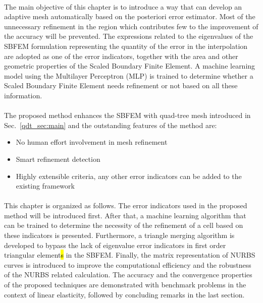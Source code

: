 \paragraph{}
The main objective of this chapter is to introduce a way that can develop an adaptive mesh automatically based on the posteriori error estimator.
Most of the unnecessary refinement in the region which contributes few to the improvement of the accuracy will be prevented.
The expressions related to the eigenvalues of the SBFEM formulation representing the quantity of the error in the interpolation are adopted as one of the error indicators, together with the area and other geometric properties of the Scaled Boundary Finite Element.
A machine learning model using the Multilayer Perceptron (MLP) is trained to determine whether a Scaled Boundary Finite Element needs refinement or not based on all these information.

\paragraph{}
The proposed method enhances the SBFEM with quad-tree mesh introduced in Sec.~\ref{qdt_sec:main} and the outstanding features of the method are:
\begin{itemize}
    \item No human effort involvement in mesh refinement
    \item Smart refinement detection
    \item Highly extensible criteria, any other error indicators can be added to the existing framework
\end{itemize}

\paragraph{}
This chapter is organized as follows.
The error indicators used in the proposed method will be introduced first.
After that, a machine learning algorithm that can be trained to determine the necessity of the refinement of a cell based on these indicators is presented.
Furthermore, a triangle merging algorithm is developed to bypass the lack of eigenvalue error indicators in first order triangular element\hl{s} in the SBFEM.
Finally, the matrix representation of NURBS curves is introduced to improve the computational efficiency and the robustness of the NURBS related calculation.
The accuracy and the convergence properties of the proposed techniques are demonstrated with benchmark problems in the context of linear elasticity, followed by concluding remarks in the last section.
